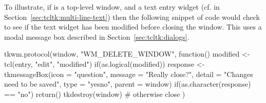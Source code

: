 To illustrate, if  is a top-level window, and  a text
entry widget (cf.  in
Section~\ref{sec:tcltk:multi-line-text}) then the following snippet of
code would check to see if the text widget has been modified before
closing the window. This uses a modal message box described in
Section~\ref{sec:tcltk:dialogs}.



\begin{Schunk}
\begin{Sinput}
 tkwm.protocol(window, "WM_DELETE_WINDOW", function() {
   modified <- tcl(entry, "edit", "modified")
   if(as.logical(modified)) {
     response <- 
       tkmessageBox(icon = "question",
                    message = "Really close?",
                    detail = "Changes need to be saved",
                    type = "yesno",
                    parent = window)
     if(as.character(response) == "no")
       return()
   }
   tkdestroy(window)                     # otherwise close
 })
\end{Sinput}
\end{Schunk}



